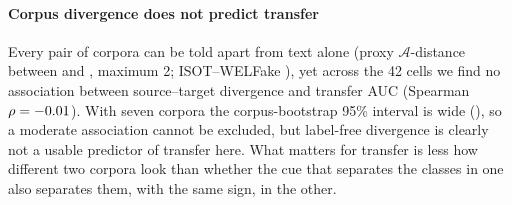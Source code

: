 \paragraph{Corpus divergence does not predict transfer}
Every pair of corpora can be told apart from text alone (proxy $\mathcal{A}$-distance between \PADmin{} and \PADmax{}, maximum 2; ISOT--WELFake \PADiw), yet across the 42 cells we find no association between source--target divergence and transfer AUC (Spearman $\rho=-0.01$). With seven corpora the corpus-bootstrap 95\% interval is wide (\PADrhoCI), so a moderate association cannot be excluded, but label-free divergence is clearly not a usable predictor of transfer here. What matters for transfer is less how different two corpora look than whether the cue that separates the classes in one also separates them, with the same sign, in the other.

